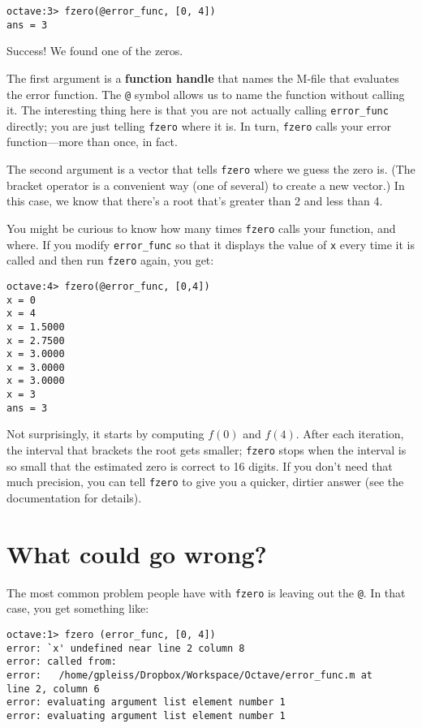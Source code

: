 \begin{verbatim}
octave:3> fzero(@error_func, [0, 4])
ans = 3
\end{verbatim}

Success! We found one of the zeros.

The first argument is a
{\bf function handle} that names the M-file that evaluates
the error function. The {\tt @} symbol allows us to name the
function without calling it. The interesting thing here is
that you are not actually calling {\tt error\_func} directly;
you are just telling {\tt fzero} where it is. In turn, {\tt fzero}
calls your error function---more than once, in fact.

The second argument is a vector that tells {\tt fzero} where we
guess the zero is. (The bracket operator is a convenient way 
(one of several) to create a new vector.) In this case, we know that
there's a root that's greater than 2 and less than 4.

You might be curious to know how many times {\tt fzero} calls your
function, and where. If you modify {\tt error\_func} so that it displays
the value of {\tt x} every time it is called and then run {\tt fzero}
again, you get:

\begin{verbatim}
octave:4> fzero(@error_func, [0,4])
x = 0
x = 4
x = 1.5000
x = 2.7500
x = 3.0000
x = 3.0000
x = 3.0000
x = 3
ans = 3
\end{verbatim}

Not surprisingly, it starts by computing $f(0)$ and $f(4)$. After
each iteration, the interval that brackets the root gets smaller;
{\tt fzero} stops when the interval is so small that the estimated
zero is correct to 16 digits. If you
don't need that much precision, you can tell {\tt fzero} to give
you a quicker, dirtier answer (see the documentation for details).


\section{What could go wrong?}

The most common problem people have with {\tt fzero} is leaving
out the {\tt @}. In that case, you get something like:

\begin{verbatim}
octave:1> fzero (error_func, [0, 4])
error: `x' undefined near line 2 column 8
error: called from:
error:   /home/gpleiss/Dropbox/Workspace/Octave/error_func.m at 
line 2, column 6
error: evaluating argument list element number 1
error: evaluating argument list element number 1
\end{verbatim}

